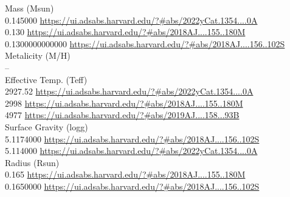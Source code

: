 Mass (Msun)\\
0.145000 \url{https://ui.adsabs.harvard.edu/?#abs/2022yCat.1354....0A}\\
0.130 \url{https://ui.adsabs.harvard.edu/?#abs/2018AJ....155..180M}\\
0.1300000000000 \url{https://ui.adsabs.harvard.edu/?#abs/2018AJ....156..102S}\\
Metalicity (M/H)\\
--\\
Effective Temp. (Teff)\\
2927.52 \url{https://ui.adsabs.harvard.edu/?#abs/2022yCat.1354....0A}\\
2998 \url{https://ui.adsabs.harvard.edu/?#abs/2018AJ....155..180M}\\
4977 \url{https://ui.adsabs.harvard.edu/?#abs/2019AJ....158...93B}\\
Surface Gravity (logg)\\
5.1174000 \url{https://ui.adsabs.harvard.edu/?#abs/2018AJ....156..102S}\\
5.114000 \url{https://ui.adsabs.harvard.edu/?#abs/2022yCat.1354....0A}\\

Radius (Rsun)\\
0.165 \url{https://ui.adsabs.harvard.edu/?#abs/2018AJ....155..180M}\\
0.1650000 \url{https://ui.adsabs.harvard.edu/?#abs/2018AJ....156..102S}\\